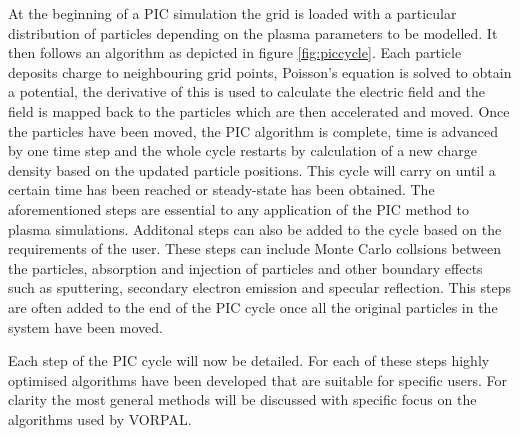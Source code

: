 At the beginning of a PIC simulation the grid is loaded with a particular distribution of particles depending on the plasma parameters to be modelled. It then follows an algorithm as depicted in figure \ref{fig:piccycle}. Each particle deposits charge to neighbouring grid points, Poisson's equation is solved to obtain a potential, the derivative of this is used to calculate the electric field and the field is mapped back to the particles which are then accelerated and moved. Once the particles have been moved, the PIC algorithm is complete, time is advanced by one time step and the whole cycle restarts by calculation of a new charge density based on the updated particle positions. This cycle will carry on until a certain time has been reached or steady-state has been obtained. The aforementioned steps are essential to any application of the PIC method to plasma simulations. Additonal steps can also be added to the cycle based on the requirements of the user. These steps can include Monte Carlo collsions between the particles, absorption and injection of particles and other boundary effects such as sputtering, secondary electron emission and specular reflection. This steps are often added to the end of the PIC cycle once all the original particles in the system have been moved. 

Each step of the PIC cycle will now be detailed. For each of these steps highly optimised algorithms have been developed that are suitable for specific users. For clarity the most general methods will be discussed with specific focus on the algorithms used by VORPAL. 






